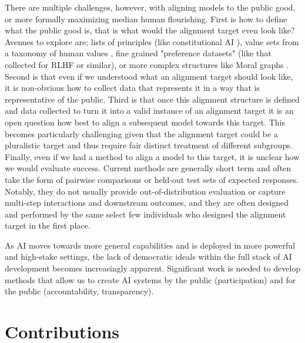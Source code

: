 There are multiple challenges, however, with aligning models to the public good, or more formally maximizing median human flourishing.
First is how to define what the public good is, that is what would the alignment target even look like? Avenues to explore are; lists of principles (like constitutional AI \cite{baiConstitutionalAIHarmlessness2022}), value sets from a taxonomy of human values \cite{schwartzUniversalsContentStructure1992,rokeachNatureHumanValues1973}, fine grained "preference datasets" (like that collected for RLHF \cite{ouyangTrainingLanguageModels2022} or similar), or more complex structures like Moral graphs \cite{klingefjordWhatAreHuman2024}.
Second is that even if we understood what an alignment target should look like, it is non-obvious how to collect data that represents it in a way that is representative of the public.
Third is that once this alignment structure is defined and data collected to turn it into a valid instance of an alignment target it is an open question how best to align a subsequent model towards this target. This becomes particularly challenging given that the alignment target could be a pluralistic target and thus require fair distinct treatment of different subgroups.
Finally, even if we had a method to align a model to this target, it is unclear how we would evaluate success. Current methods are generally short term and often take the form of pairwise comparisons or held-out test sets of expected responses. Notably, they do not usually provide out-of-distribution evaluation or capture multi-step interactions and downstream outcomes, and they are often designed and performed by the same select few individuals who designed the alignment target in the first place.

As AI moves towards more general capabilities and is deployed in more powerful and high-stake settings, the lack of democratic ideals within the full stack of AI development becomes increasingly apparent. Significant work is needed to develop methods that allow us to create AI systems by the public (participation) and for the public (accountability, transparency).

\section{Contributions}

